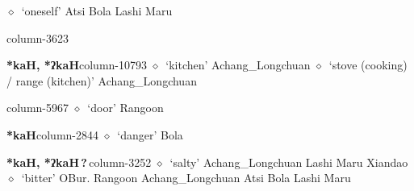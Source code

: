          $\diamond$~`oneself'
         Atsi 
\hspace{1ex}
         Bola 
\hspace{1ex}
         Lashi 
\hspace{1ex}
         Maru 
  \item {\footnotesize \textbf{}}{\tiny column-3623}
  \item {\footnotesize \textbf{*kaH, *ʔkaH}}{\tiny column-10793}
         $\diamond$~`kitchen'
         Achang\_Longchuan 
\hspace{1ex}
         $\diamond$~`stove (cooking) / range (kitchen)'
         Achang\_Longchuan 
  \item {\footnotesize \textbf{}}{\tiny column-5967}
         $\diamond$~`door'
         Rangoon 
  \item {\footnotesize \textbf{*kaH}}{\tiny column-2844}
         $\diamond$~`danger'
         Bola 
  \item {\footnotesize \textbf{*kaH, *ʔkaH\,?\,}}{\tiny column-3252}
         $\diamond$~`salty'
         Achang\_Longchuan 
\hspace{1ex}
         Lashi 
\hspace{1ex}
         Maru 
\hspace{1ex}
         Xiandao 
\hspace{1ex}
         $\diamond$~`bitter'
         OBur. 
\hspace{1ex}
         Rangoon 
\hspace{1ex}
         Achang\_Longchuan 
\hspace{1ex}
         Atsi 
\hspace{1ex}
         Bola 
\hspace{1ex}
         Lashi 
\hspace{1ex}
         Maru 
\hspace{1ex}
